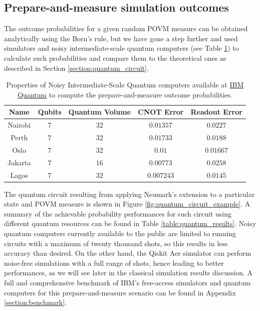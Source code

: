 \subsection{Prepare-and-measure simulation outcomes}
The outcome probabilities for a given random POVM measure can be obtained analytically using the Born's rule, but we have gone a step further and used simulators and noisy intermediate-scale quantum computers (see Table \ref{table:quantum_resources}) to calculate such probabilities and compare them to the theoretical ones as described in Section \ref{section:quantum_circuit}. 
\newline
\begin{table}[h!]
\centering
{\renewcommand{\arraystretch}{1.2}%
\begin{tabular}{c c c c c} 
 \toprule
 Name & Qubits & Quantum Volume & CNOT Error & Readout Error \\ \hline
 Nairobi    & $\scriptstyle7$ 
            & $\scriptstyle32$ 
            & $\scriptstyle0.01357$ 
            & $\scriptstyle0.0227$ \\ 
 Perth      & $\scriptstyle7$ 
            & $\scriptstyle32$ 
            & $\scriptstyle0.01733$ 
            & $\scriptstyle0.0188$ \\ 
 Oslo       & $\scriptstyle7$ 
            & $\scriptstyle32$ 
            & $\scriptstyle0.01$ 
            & $\scriptstyle0.01667$ \\ 
 Jakarta    & $\scriptstyle7$ 
            & $\scriptstyle16$ 
            & $\scriptstyle0.00773$ 
            & $\scriptstyle0.0258$ \\ 
 Lagos      & $\scriptstyle7$ 
            & $\scriptstyle32$ 
            & $\scriptstyle0.007243$ 
            & $\scriptstyle0.0145$ \\ 
 \bottomrule
\end{tabular}}
\caption{Properties of Noisy Intermediate-Scale Quantum computers available at \href{https://quantum-computing.ibm.com}{IBM Quantum} to compute the prepare-and-measure outcome probabilities.}
\label{table:quantum_resources}
\end{table}

The quantum circuit resulting from applying Neumark's extension to a particular state and POVM measure is shown in Figure \ref{fig:quantum_circuit_example}. A summary of the achievable probability performances for such circuit using different quantum resources can be found in Table \ref{table:quantum_results}. Noisy quantum computers currently available to the public are limited to running circuits with a maximum of twenty thousand shots, so this results in less accuracy than desired. On the other hand, the Qiskit Aer simulator can perform noise-free simulations with a full range of shots, hence leading to better performances, as we will see later in the classical simulation results discussion. A full and comprehensive benchmark of IBM's free-access simulators and quantum computers for this prepare-and-measure scenario can be found in Appendix \ref{section:benchmark}.


